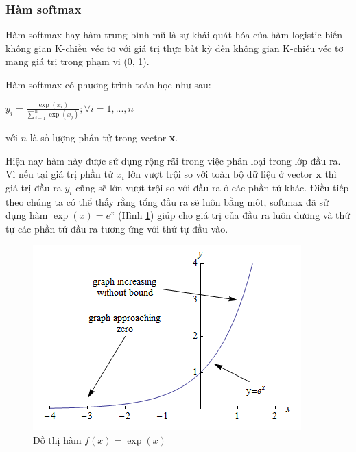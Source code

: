 	\subsubsection{Hàm softmax}
	\label{sec:softmax}
	\hspace{5mm} Hàm softmax hay hàm trung bình mũ là sự khái quát hóa của hàm logistic biến không gian K-chiều véc tơ  với giá trị thực bất kỳ đến không gian K-chiều véc tơ  mang giá trị trong phạm vi (0, 1).\par

Hàm softmax có phương trình toán học như sau:
\begin{center}
	$y_i=\frac{\exp({x_i})}{\sum^{n}_{j=1}{\exp({x_j})}}; \forall i=1,...,n$ %
	
	
\end{center}	
với $n$ là số lượng phần tử trong vector \textbf{x}.\par
Hiện nay hàm này được sử dụng rộng rãi trong việc phân loại trong lớp đầu ra. Vì nếu tại giá trị phần tử $x_i$ lớn vượt trội so với toàn bộ dữ liệu ở vector $\textbf{x}$ thì giá trị đầu ra $y_i$ cũng sẽ lớn vượt trội so với đầu ra ở các phần tử khác. Điều tiếp theo chúng ta có thể thấy rằng tổng đầu ra sẽ luôn bằng môt, softmax đã sử dụng hàm $\exp(x)=e^{x}$ (Hình \ref{fig:hamex}) giúp cho giá trị của đầu ra luôn dương và thứ tự các phần tử đầu ra tương ứng với thứ tự đầu vào.
\begin{center}
	\begin{figure}[htp]
	\begin{center}
		\includegraphics[scale=1]{chap3/image/expgraph.png}
	\end{center}			
	\caption{Đồ thị hàm $f(x)=\exp(x)$}
	\label{fig:hamex}
	\end{figure}
\end{center}

